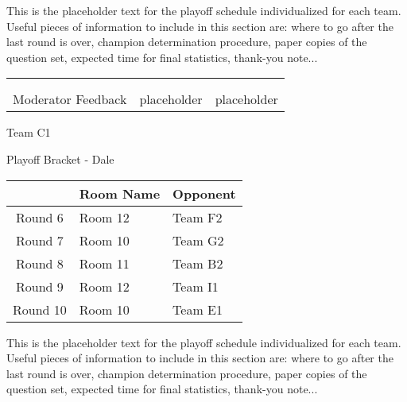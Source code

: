 \documentclass{article}%
\begin{document}
\vspace*{30pt}%
\linebreak%
This is the placeholder text for the playoff schedule individualized for each team. Useful pieces of information to include in this section are: where to go after the last round is over, champion determination procedure, paper copies of the question set, expected time for final statistics, thank{-}you note...%
\vspace*{30pt}%
\newline%
%
\begin{tabularx}{\textwidth}{YYY}%
  &  &  \\%
\\%
Moderator Feedback&placeholder&placeholder\\%
\end{tabularx}%
\newpage%
\begin{center}%
\begin{Huge}%
Team C1%
\end{Huge}%
\vspace*{12pt}%
\linebreak%
\begin{Large}%
Playoff Bracket {-} Dale%
\end{Large}%
\end{center}%
\vspace*{4pt}%
%
\begin{tabularx}{\textwidth}{|c|Y|Y|}%
\hline%
&Room Name&Opponent\\%
\hline%
Round 6&Room 12&Team F2\\%
Round 7&Room 10&Team G2\\%
Round 8&Room 11&Team B2\\%
Round 9&Room 12&Team I1\\%
Round 10&Room 10&Team E1\\%
\hline%
\end{tabularx}%
\vspace*{30pt}%
\linebreak%
This is the placeholder text for the playoff schedule individualized for each team. Useful pieces of information to include in this section are: where to go after the last round is over, champion determination procedure, paper copies of the question set, expected time for final statistics, thank{-}you note...%
\vspace*{30pt}%
\end{document}
